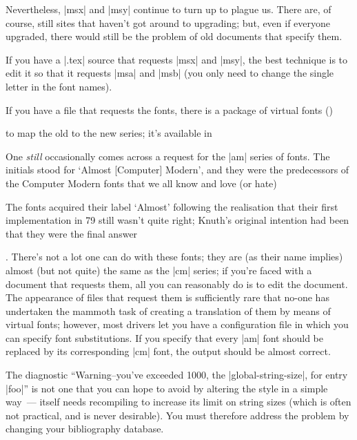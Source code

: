 \begin{changemargin}{-1cm}{-1cm}
Nevertheless, |msx| and |msy| continue to turn up to plague us.  There
are, of course, still sites that haven't got around to upgrading; but,
even if everyone upgraded, there would still be the problem of old
documents that specify them.

If you have a |.tex| source that requests |msx| and |msy|, the best
technique is to edit it so that it requests |msa| and |msb| (you only
need to change the single letter in the font names).

If you have a  file that requests the fonts, there is a package
of
\htmlignore
virtual fonts ()
\endhtmlignore
\begin{htmlversion}
\end{htmlversion}
to map the old to the new series; it's available in 


One \emph{still} occasionally comes across a request for the |am|
series of fonts.  The initials stood for `Almost [Computer] Modern',
and they were the predecessors of the Computer Modern fonts that we
all know and love (or hate)\begin{footnoteenv}
The fonts acquired their label `Almost' following the realisation
that their first implementation in \MF{}79 still wasn't quite right;
Knuth's original intention had been that they were the final answer
\end{footnoteenv}.
There's not a lot one can do with these
fonts; they are (as their name implies) almost (but not quite) the
same as the |cm| series; if you're faced with a document that requests
them, all you can reasonably do is to edit the document.  The
appearance of  files that request them is sufficiently rare that
no-one has undertaken the mammoth task of creating a translation of
them by means of virtual fonts; however, most drivers let you have a
configuration file in which you can specify font substitutions. If you
specify that every |am| font should be replaced by its corresponding
|cm| font, the output should be almost correct.


The \BibTeX{}  diagnostic ``Warning--you've exceeded 1000, the
|global-string-size|, for entry |foo|'' is not one that you can hope
to avoid by altering the \BibTeX{} style in a simple way~--- \BibTeX{}
itself needs recompiling to increase its limit on string sizes (which is
often not practical, and is never desirable).  You must therefore 
address the problem by changing your bibliography database.


\end{changemargin}
